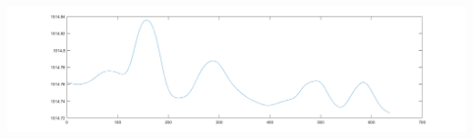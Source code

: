\documentclass[a4paper]{article}
\begin{document}
\makebox[\linewidth]{}
\makebox[\linewidth]{}
\makebox[\linewidth]{}
\makebox[\linewidth]{}
\begin{minipage}{\linewidth}
\begin{center}
\includegraphics[width=160mm,scale=0.2]{./images/segnali/pressure_phone_gauss.png} 
\end{center}
\end{minipage}
\end{document}
